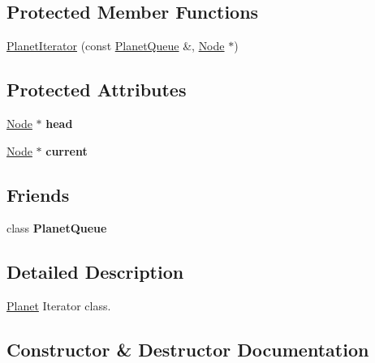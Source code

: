 \subsection*{Protected Member Functions}
\begin{DoxyCompactItemize}
\item 
\hyperlink{classPlanetIterator_ab5c84527dd5b82051e9f59c650dbd5bc}{Planet\+Iterator} (const \hyperlink{classPlanetQueue}{Planet\+Queue} \&, \hyperlink{classNode}{Node} $\ast$)
\end{DoxyCompactItemize}
\subsection*{Protected Attributes}
\begin{DoxyCompactItemize}
\item 
\mbox{\label{classPlanetIterator_a8b284f4aa03057d485c42d1962ab9939}} 
\hyperlink{classNode}{Node} $\ast$ {\bfseries head}
\item 
\mbox{\label{classPlanetIterator_a00c46ae901520be5ff52c38eaa08a3b6}} 
\hyperlink{classNode}{Node} $\ast$ {\bfseries current}
\end{DoxyCompactItemize}
\subsection*{Friends}
\begin{DoxyCompactItemize}
\item 
\mbox{\label{classPlanetIterator_af4641bececf1b32ed2e8b02c382d7e77}} 
class {\bfseries Planet\+Queue}
\end{DoxyCompactItemize}


\subsection{Detailed Description}
\hyperlink{classPlanet}{Planet} Iterator class. 

\subsection{Constructor \& Destructor Documentation}
\mbox{\label{classPlanetIterator_ac0769a13686b355e55e687de11231d9c}} 
